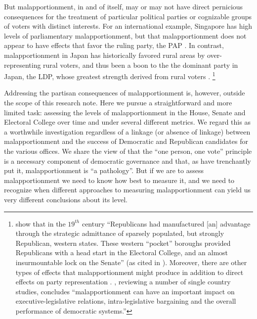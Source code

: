 But malapportionment, in and of itself, may or may not have direct pernicious consequences for the treatment of particular political parties or cognizable groups of voters with distinct interests. For an international example, Singapore has high levels of parliamentary malapportionment, but that malapportionment does not appear to have effects that favor the ruling party, the PAP \citep{Tan2018}. In contrast, malapportionment in Japan has historically favored rural areas by over-representing rural voters, and thus been a boon to the the dominant party in Japan, the LDP, whose greatest strength derived from rural voters \cite{Moriwaka2008}. \footnote{\citet[][]{Stewart_Weingast1992} show that in the $19^{th}$ century ``Republicans had manufactured [an] advantage through the strategic admittance of sparsely populated, but strongly Republican, western states. These western ``pocket'' boroughs provided Republicans with a head start in the Electoral College, and an almost insurmountable lock on the Senate'' (as cited in \citet[][pg. 94]{Engstrom2013}). Moreover, there are other types of effects that malapportionment might produce in addition to direct effects on party representation . \citet[][pg. 653]{SamuelsSnyder2001}, reviewing a number of single country studies, concludes ``malapportionment can have an important impact on executive-legislative relations, intra-legislative bargaining and the overall performance of democratic systems.''}

Addressing the partisan consequences of malapportionment is, however, outside the scope of this research note. Here we pursue a straightforward and more limited task: assessing the levels of malapportionment in the House, Senate and Electoral College over time and under several different metrics. We regard this as a worthwhile investigation regardless of a linkage (or absence of linkage) between malapportionment and the success of Democratic and Republican candidates for the various offices. We share the view of \citet{Dahl1971} that the ``one person, one vote'' principle is a necessary component of democratic governance and that, as \citet{Taagepera1989} have trenchantly put it, malapportionment is ``a pathology''. But if we are to assess malapportionment we need to know how best to measure it, and we need to recognize when different approaches to measuring malapportionment can yield us very different conclusions about its level.

